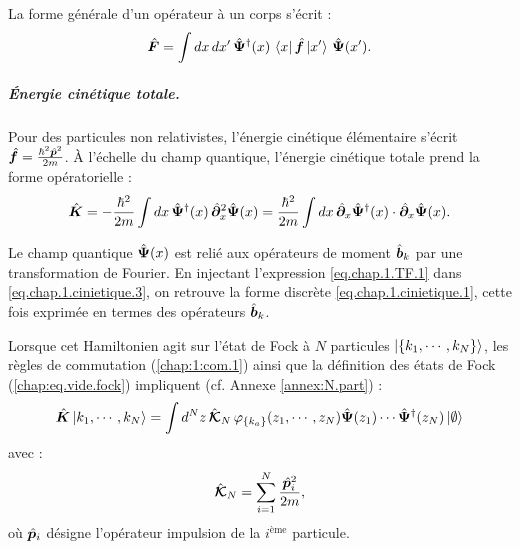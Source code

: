 La forme générale d’un opérateur à un corps s’écrit :
\begin{eqnarray}\label{chap.1:eq.rapel.opp.1.second.1}
\hat{\bm{F}} = \int dx \, dx' \, \hat{\bm{\Psi}}^\dagger(x) \, \bra{ x} \hat{\bm{f}} \ket{x'} \, \hat{\bm{\Psi}}(x').
\end{eqnarray}%
\begin{mdframed}[
	linewidth=0.5pt, 
	backgroundcolor=gray!5, 
	roundcorner=50pt,	
	innerleftmargin=5pt,
    innerrightmargin=5pt,
    innertopmargin=-10pt,
    innerbottommargin=2pt,
    leftmargin=2pt,
    rightmargin=2pt
]
\subparagraph{Énergie cinétique totale.}

Pour des particules non relativistes, l’énergie cinétique élémentaire s’écrit $\hat{\bm{f}} = \frac{\hbar^2 \hat{\bm{p}}^2}{2m}$. À l’échelle du champ quantique, l’énergie cinétique totale prend la forme opératorielle :
\begin{eqnarray}
\hat{\bm{K}} =  -\frac{\hbar^2}{2m} \int dx \, \hat{\bm{\Psi}}^\dagger(x) \, \hat{\bm{\partial}}_x^2 \hat{\bm{\Psi}}(x)
= \frac{\hbar^2}{2m} \int dx \, \hat{\bm{\partial}}_x \hat{\bm{\Psi}}^\dagger(x) \cdot \hat{\bm{\partial}}_x \hat{\bm{\Psi}}(x). \label{eq.chap.1.cinietique.3}
\end{eqnarray}

Le champ quantique $\hat{\bm{\Psi}}(x)$ est relié aux opérateurs de moment $\hat{\bm{b}}_k$ par une transformation de Fourier. En injectant l'expression \eqref{eq.chap.1.TF.1} dans \eqref{eq.chap.1.cinietique.3}, on retrouve la forme discrète \eqref{eq.chap.1.cinietique.1}, cette fois exprimée en termes des opérateurs $\hat{\bm{b}}_k$.

Lorsque cet Hamiltonien agit sur l’état de Fock à $N$ particules $\ket{\{k_1 , \cdots , k_N\}}$, les règles de commutation (\ref{chap:1:com.1}) ainsi que la définition des états de Fock (\ref{chap:eq.vide.fock}) impliquent (cf. Annexe \ref{annex:N.part}) :
\begin{eqnarray}
\hat{\bm{K}}\ket{k_1 , \cdots , k_N } =  \int d^N z \, \hat{\bm{\mathcal{K}}}_N \, \varphi_{\{k_a\}}(z_1 , \cdots , z_N ) \hat{\bm{\Psi}}(z_1) \cdots \hat{\bm{\Psi}}^\dag(z_N) \ket{\emptyset}
\end{eqnarray}
avec :
\[
	\hat{\bm{\mathcal{K}}}_N = \sum_{i=1}^N \frac{\hat{\bm{p}}_i^2}{2m},
\]
où \( \hat{\bm{p}}_i \) désigne l’opérateur impulsion de la \( i^\text{ème} \) particule.
\end{mdframed}




